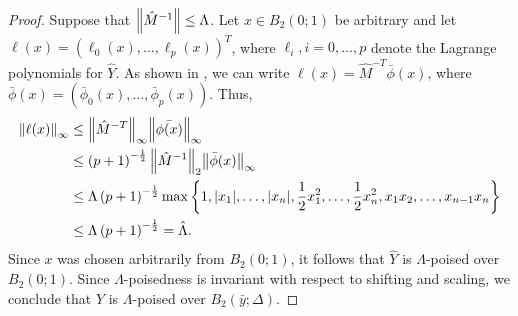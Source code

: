 \documentclass{article}
\begin{document}
%
%
%



\begin{proof}
Suppose that ${\left\|\hat{M}^{-1}\right\|} \le \Lambda$.    
Let $x \in B_2(0;1)$ be arbitrary and let $\ell(x) = (\ell_0(x), \ldots, \ell_p(x))^T$, where $\ell_i, i=0,\ldots,p$ denote the Lagrange polynomials for $\hat{Y}$.
As shown in \cite{introduction_book}, we can write $\ell(x) = \hat{M}^{-T}\bar{\phi}(x)$, 
where $\bar{\phi}(x) = (\bar{\phi}_0(x), \ldots, \bar{\phi}_p(x))$.
Thus,
\begin{align*}
{\left\|\ell(x)\right\|}_{\infty} & \le {\left\|\hat{M}^{-T}\right\|}_{\infty} {\left\|\bar{\phi(x)}\right\|}_{\infty} \\
& \le \left(p+1\right)^{-\frac 1 2} {\left\|\hat{M}^{-1}\right\|}_2 {\left\|\bar{\phi}(x)\right\|}_{\infty} \\
& \le \Lambda \left(p+1\right)^{-\frac 1 2} \max\left\{1, |x_1|, \ldots,|x_n|, \frac 1 2 x_1^2, \ldots, \frac 1 2 x_n^2, x_1x_2, \ldots, x_{n-1}x_n\right\}\\
& \le \Lambda \left(p+1\right)^{-\frac 1 2}   = \hat{\Lambda}.
\end{align*}
Since $x$ was chosen arbitrarily from $B_2(0;1)$, it follows that $\hat{Y}$ is $\Lambda$-poised over $B_2(0;1)$.   Since $\Lambda$-poisedness is invariant with respect to shifting and scaling,  we conclude that $Y$ is $\Lambda$-poised over $B_2(\bar{y};\Delta)$.


\end{proof}
\end{document}
